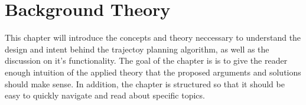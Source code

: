 \section{Background Theory}
This chapter will introduce the concepts and theory neccessary to understand the design and intent behind the trajectoy planning algorithm, as well as the discussion on it's functionality.
The goal of the chapter is is to give the reader enough intuition of the applied theory that the proposed arguments and solutions should make sense. In addition, the chapter is structured
so that it should be easy to quickly navigate and read about specific topics.


